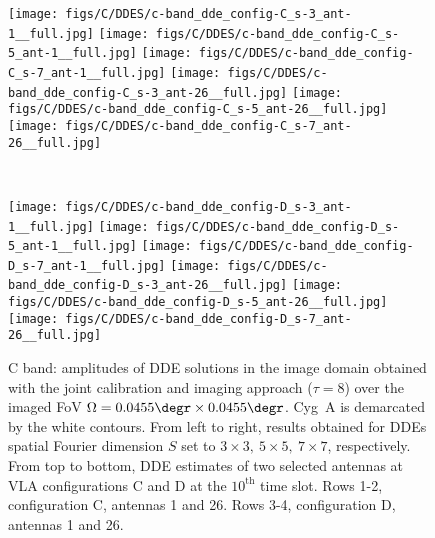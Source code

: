 \begin{figure*}
\begin{minipage}[t]{1\linewidth}\centering
\texttt{[image: figs/C/DDES/c-band\_dde\_config-C\_s-3\_ant-1\_\_full.jpg]}
\texttt{[image: figs/C/DDES/c-band\_dde\_config-C\_s-5\_ant-1\_\_full.jpg]}
\texttt{[image: figs/C/DDES/c-band\_dde\_config-C\_s-7\_ant-1\_\_full.jpg]}
\texttt{[image: figs/C/DDES/c-band\_dde\_config-C\_s-3\_ant-26\_\_full.jpg]}
\texttt{[image: figs/C/DDES/c-band\_dde\_config-C\_s-5\_ant-26\_\_full.jpg]}
\texttt{[image: figs/C/DDES/c-band\_dde\_config-C\_s-7\_ant-26\_\_full.jpg]}
\end{minipage}
~\\
\begin{minipage}[t]{1\linewidth}\centering
\texttt{[image: figs/C/DDES/c-band\_dde\_config-D\_s-3\_ant-1\_\_full.jpg]}
\texttt{[image: figs/C/DDES/c-band\_dde\_config-D\_s-5\_ant-1\_\_full.jpg]}
\texttt{[image: figs/C/DDES/c-band\_dde\_config-D\_s-7\_ant-1\_\_full.jpg]}
\texttt{[image: figs/C/DDES/c-band\_dde\_config-D\_s-3\_ant-26\_\_full.jpg]}
\texttt{[image: figs/C/DDES/c-band\_dde\_config-D\_s-5\_ant-26\_\_full.jpg]}
\texttt{[image: figs/C/DDES/c-band\_dde\_config-D\_s-7\_ant-26\_\_full.jpg]}
\end{minipage}
\caption{{C band: amplitudes of DDE solutions in the image domain obtained with the joint calibration and imaging approach ($\tau =8$) over the imaged FoV $\Omega= 0.0455\degr \times 0.0455\degr$. Cyg~A is demarcated by the white contours.  From left to right, results obtained for DDEs spatial Fourier dimension $S$ set to $3\times 3,~5\times 5,~ 7\times 7$, respectively. From top to bottom, DDE estimates of two selected antennas at VLA configurations C and D at {the $10^{\textrm{th}}$} time slot. Rows 1-2, configuration C, antennas 1 and 26. Rows 3-4, configuration D, antennas 1 and 26.}}
\label{fig:c_dde_solutions_full2}
\end{figure*}
